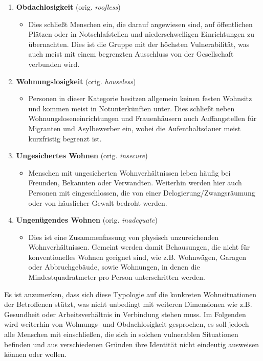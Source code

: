 \begin{enumerate}
	\item \textbf{Obdachlosigkeit} (orig. \textit{roofless})
	\begin{itemize}
		\item[] Dies schließt Menschen ein, die darauf angewiesen sind, auf öffentlichen Plätzen oder in Notschlafstellen und niederschwelligen Einrichtungen zu übernachten. Dies ist die Gruppe mit der höchsten Vulnerabilität, was auch meist mit einem begrenzten Ausschluss von der Gesellschaft verbunden wird.
	\end{itemize} \newpage
	\item \textbf{Wohnungslosigkeit} (orig. \textit{houseless})
		\begin{itemize}
			\item[] Personen in dieser Kategorie besitzen allgemein keinen festen Wohnsitz und kommen meist in Notunterkünften unter. Dies schließt neben Wohnungsloseneinrichtungen und Frauenhäusern auch Auffangstellen für Migranten und Asylbewerber ein, wobei die Aufenthaltsdauer meist kurzfristig begrenzt ist.
		\end{itemize}
	\item \textbf{Ungesichertes Wohnen} (orig. \textit{insecure})
		\begin{itemize}
			\item[] Menschen mit ungesicherten Wohnverhältnissen leben häufig bei Freunden, Bekannten oder Verwandten. Weiterhin werden hier auch Personen mit eingeschlossen, die von einer Delogierung/Zwangsräumung oder von häuslicher Gewalt bedroht werden.
		\end{itemize}
	\item \textbf{Ungenügendes Wohnen} (orig. \textit{inadequate})
		\begin{itemize}
			\item[] Dies ist eine Zusammenfassung von physisch unzureichenden Wohnverhältnissen. Gemeint werden damit Behausungen, die nicht für konventionelles Wohnen geeignet sind, wie z.B. Wohnwägen, Garagen oder Abbruchgebäude, sowie Wohnungen, in denen die Mindestquadratmeter pro Person unterschritten werden.
		\end{itemize}
\end{enumerate}

Es ist anzumerken, dass sich diese Typologie auf die konkreten Wohnsituationen der Betroffenen stützt, was nicht unbedingt mit weiteren Dimensionen wie z.B. Gesundheit oder Arbeitsverhältnis in Verbindung stehen muss. Im Folgenden wird weiterhin von Wohnungs- und Obdachlosigkeit gesprochen, es soll jedoch alle Menschen mit einschließen, die sich in solchen vulnerablen Situationen befinden und aus verschiedenen Gründen ihre Identität nicht eindeutig ausweisen können oder wollen.


